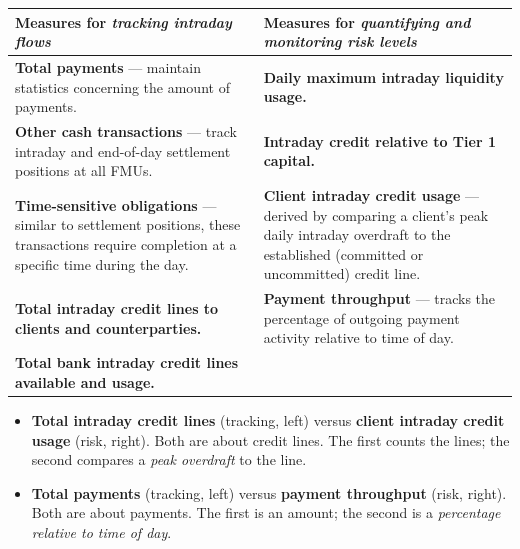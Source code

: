 \begin{center}
\small
\begin{tabularx}{\textwidth}{@{}p{} p{}@{}}
\toprule
\rowcolor{PaleNavy}\textbf{Measures for \emph{tracking intraday flows}} &
\cellcolor{PaleGold}\textbf{Measures for \emph{quantifying and monitoring risk levels}} \\
\midrule
\textbf{Total payments} — maintain statistics concerning the amount of payments. &
\textbf{Daily maximum intraday liquidity usage.} \\
\addlinespace
\textbf{Other cash transactions} — track intraday and end-of-day settlement positions at all FMUs. &
\textbf{Intraday credit relative to Tier 1 capital.} \\
\addlinespace
\textbf{Time-sensitive obligations} — similar to settlement positions, these transactions require completion at a specific time during the day. &
\textbf{Client intraday credit usage} — derived by comparing a client's peak daily intraday overdraft to the established (committed or uncommitted) credit line. \\
\addlinespace
\textbf{Total intraday credit lines to clients and counterparties.} &
\textbf{Payment throughput} — tracks the percentage of outgoing payment activity relative to time of day. \\
\addlinespace
\textbf{Total bank intraday credit lines available and usage.} & \\
\bottomrule
\end{tabularx}
\end{center}

\begin{lrtrapbox}
\begin{itemize}
\item \textbf{Total intraday credit lines} (tracking, left) versus \textbf{client intraday credit usage} (risk, right). Both are about credit lines. The first counts the lines; the second compares a \emph{peak overdraft} to the line.
\item \textbf{Total payments} (tracking, left) versus \textbf{payment throughput} (risk, right). Both are about payments. The first is an amount; the second is a \emph{percentage relative to time of day}.
\end{itemize}
\end{lrtrapbox}

